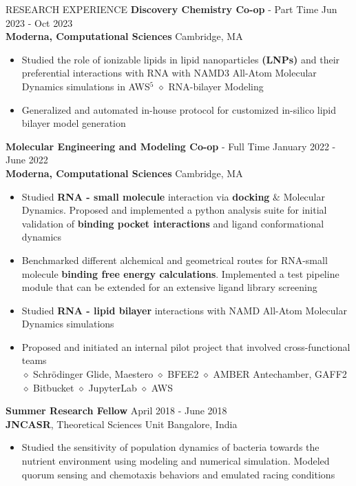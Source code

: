 \documentclass{resume} %
\begin{document}
\begin{rSection}{RESEARCH EXPERIENCE}
   \textbf{Discovery Chemistry Co-op} - Part Time \hfill Jun 2023 - Oct 2023\\
   \textbf{Moderna, Computational Sciences} \hfill {Cambridge, MA}
   \begin{itemize}
      \itemsep -1pt {}
      \item Studied the role of ionizable lipids in lipid nanoparticles \textbf{(LNPs)} and their preferential interactions with RNA with NAMD3 All-Atom Molecular Dynamics simulations in AWS${^5}$ 
            $\diamond$ RNA-bilayer Modeling %
      \item Generalized and automated in-house protocol for customized in-silico lipid bilayer model generation
   \end{itemize}

   \textbf{Molecular Engineering and Modeling Co-op} - Full Time \hfill January 2022 - June 2022\\
   \textbf{Moderna, Computational Sciences} \hfill {Cambridge, MA}
   \begin{itemize}
      \itemsep -1pt {}
      \item Studied \textbf{RNA - small molecule} interaction via \textbf{docking} $\&$ Molecular Dynamics. Proposed and implemented a python analysis suite for initial validation of \textbf{binding pocket interactions} and ligand conformational dynamics
      \item Benchmarked different alchemical and geometrical routes for RNA-small molecule \textbf{binding free energy calculations}. Implemented a test pipeline module that can be extended for an extensive ligand library screening
      \item Studied \textbf{RNA - lipid bilayer} interactions with NAMD All-Atom Molecular Dynamics simulations
      \item  Proposed and initiated an internal pilot project that involved cross-functional teams \\
            $\diamond$ Schr{\"o}dinger Glide, Maestero $\diamond$  BFEE2 $\diamond$ AMBER Antechamber, GAFF2 $\diamond$ Bitbucket $\diamond$ JupyterLab $\diamond$ AWS
   \end{itemize}

   \textbf{Summer Research Fellow} \hfill April 2018 - June 2018\\
   \textbf{JNCASR}, Theoretical Sciences Unit \hfill {Bangalore, India}
   \begin{itemize}
      \itemsep -1pt {}
      \item Studied the sensitivity of population dynamics of bacteria towards the nutrient environment using modeling and numerical simulation. Modeled quorum sensing and chemotaxis behaviors and emulated racing conditions
   \end{itemize}


\end{rSection}
\end{document}
